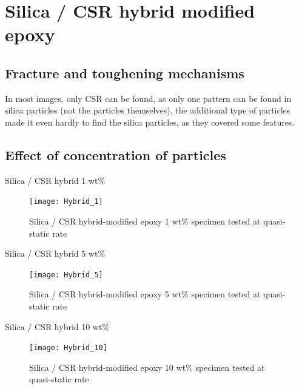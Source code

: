 \documentclass[numbers=noendperiod,chapterprefix=on]{icldt} %
\begin{document}
{\section{Silica / CSR hybrid modified epoxy}



\subsection{Fracture and toughening mechanisms}

In most images, only CSR can be found, as only one pattern can be found in silica particles (not the particles themselves), the additional type of particles made it even hardly to find the silica particles, as they covered some features.

\subsection{Effect of concentration of particles}

Silica / CSR hybrid 1 wt\%

\begin{figure}[!htpb]
\centering
\texttt{[image: Hybrid\_1]}
\caption{Silica / CSR hybrid-modified epoxy 1 wt\% specimen tested at quasi-static rate}\label{Hybrid_1}
\end{figure}
\FloatBarrier

Silica / CSR hybrid 5 wt\%

\begin{figure}[!htpb]
\centering
\texttt{[image: Hybrid\_5]}
\caption{Silica / CSR hybrid-modified epoxy 5 wt\% specimen tested at quasi-static rate}\label{Hybrid_5}
\end{figure}
\FloatBarrier

Silica / CSR hybrid 10 wt\%

\begin{figure}[!htpb]
\centering
\texttt{[image: Hybrid\_10]}
\caption{Silica / CSR hybrid-modified epoxy 10 wt\% specimen tested at quasi-static rate}\label{Hybrid_10}
\end{figure}
\FloatBarrier


}
\end{document}

